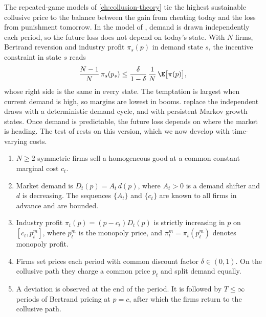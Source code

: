 The repeated-game models of \cref{ch:collusion-theory} tie the highest sustainable collusive price to the
balance between the gain from cheating today and the loss from punishment tomorrow. In the model of
\citet{RotembergSaloner1986}, demand is drawn independently each period, so the future loss does not depend
on today's state. With $N$ firms, Bertrand reversion and industry profit $\pi_s(p)$ in demand state $s$, the
incentive constraint in state $s$ reads
\begin{equation}\label{eq:13-rs-recap}
\frac{N-1}{N}\,\pi_s(p_s)\le\frac{\delta}{1-\delta}\,\frac{1}{N}\,\E\big[\pi(p)\big],
\end{equation}
whose right side is the same in every state. The temptation is largest when current demand is high, so
margins are lowest in booms. \citet{HaltiwangerHarrington1991} replace the independent draws with a
deterministic demand cycle, and \citet{BagwellStaiger1997} with persistent Markov growth states. Once demand
is predictable, the future loss depends on where the market is heading. The test of
\citet{BorensteinShepard1996} rests on this version, which we now develop with time-varying costs.

\begin{assumption}\label{asm:13-gas-model}
\leavevmode
\begin{enumerate}[label=(\roman*)]
\item $N\ge2$ symmetric firms sell a homogeneous good at a common constant marginal cost $c_t$.
\item Market demand is $D_t(p)=A_t\,d(p)$, where $A_t>0$ is a demand shifter and $d$ is decreasing. The
sequences $\{A_t\}$ and $\{c_t\}$ are known to all firms in advance and are bounded.
\item Industry profit $\pi_t(p)=(p-c_t)D_t(p)$ is strictly increasing in $p$ on $[c_t,p^m_t]$, where
$p^m_t$ is the monopoly price, and $\pi^m_t=\pi_t(p^m_t)$ denotes monopoly profit.
\item Firms set prices each period with common discount factor $\delta\in(0,1)$. On the collusive path they
charge a common price $p_t$ and split demand equally.
\item A deviation is observed at the end of the period. It is followed by $T\le\infty$ periods of Bertrand
pricing at $p=c$, after which the firms return to the collusive path.
\end{enumerate}
\end{assumption}

